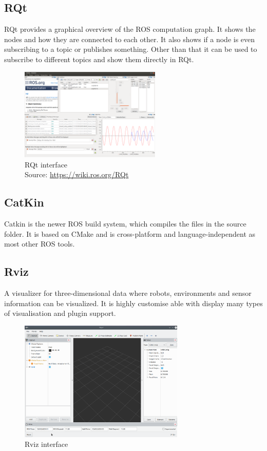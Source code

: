 \subsection{RQt}
RQt provides a graphical overview of the ROS computation graph. It shows the nodes and how they are connected to each other. It also shows if a node is even subscribing to a topic or publishes something. Other than that it can be used to subscribe to different topics and show them directly in RQt.
\begin{figure}[h]
	\centering
	\includegraphics[width=0.6\textwidth]{./media/images/RQt}
  	\caption{RQt interface\\Source: \url{https://wiki.ros.org/RQt}}
  	\label{rqtinterface}
\end{figure}

\subsection{CatKin}
Catkin is the newer ROS build system, which compiles the files in the source folder. It is based on CMake and is cross-platform and language-independent as most other ROS tools.

\subsection{Rviz}
A visualizer for three-dimensional data where robots, environments and sensor information can be visualized. It is highly customise able with display many types of visualisation and plugin support. \\
\begin{figure}[h]
	\centering
	\includegraphics[width=0.7\textwidth]{./media/images/rviz}
  	\caption{Rviz interface}
  	\label{rvizinterface}
\end{figure}


